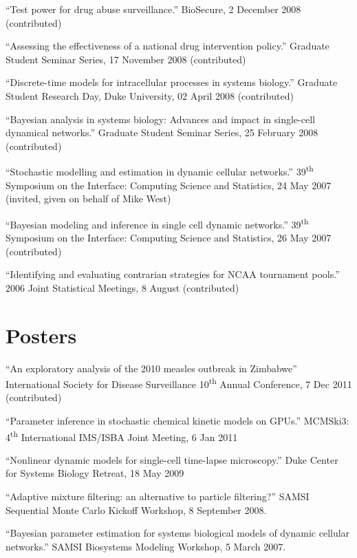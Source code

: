 \documentclass[overlapped,line,letterpaper]{res}
\begin{document}
\begin{resume}
{``Test power for drug abuse surveillance.'' BioSecure, 2 December 2008 (contributed)

``Assessing the effectiveness of a national drug intervention policy.'' Graduate Student Seminar Series, 17 November 2008 (contributed)

``Discrete-time models for intracellular processes in systems biology.'' Graduate Student Research Day, Duke University, 02 April 2008 (contributed)

``Bayesian analysis in systems biology: Advances and impact in single-cell dynamical networks.'' Graduate Student Seminar Series, 25 February 2008 (contributed)

``Stochastic modelling and estimation in dynamic cellular networks.'' 39\textsuperscript{th} Symposium on the Interface: Computing Science and Statistics, 24 May 2007 (invited, given on behalf of Mike West)

``Bayesian modeling and inference in single cell dynamic networks.'' 39\textsuperscript{th} Symposium on the Interface: Computing Science and Statistics, 26 May 2007 (contributed)

``Identifying and evaluating contrarian strategies for NCAA tournament pools.'' 2006 Joint Statistical Meetings, 8 August (contributed)

}


\section{\bf Posters}

{\small

``An exploratory analysis of the 2010 measles outbreak in Zimbabwe'' International Society for Disease Surveillance 10\textsuperscript{th} Annual Conference, 7 Dec 2011 (contributed)

``Parameter inference in stochastic chemical kinetic models on GPUs.'' MCMSki3: 4\textsuperscript{th} International IMS/ISBA Joint Meeting, 6 Jan 2011

``Nonlinear dynamic models for single-cell time-lapse microscopy.'' Duke Center for Systems Biology Retreat, 18 May 2009

``Adaptive mixture filtering: an alternative to particle filtering?'' SAMSI Sequential Monte Carlo Kickoff Workshop, 8 September 2008.

``Bayesian parameter estimation for systems biological models of dynamic cellular networks.'' SAMSI Biosystems Modeling Workshop, 5 March 2007.

}
\end{resume}
\end{document}
